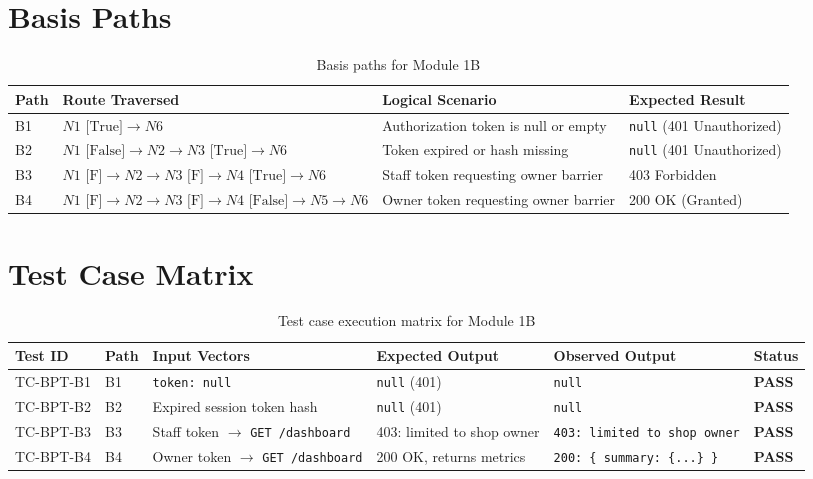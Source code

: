 \documentclass[12pt, a4paper]{report}
\begin{document}
\section{Basis Paths}
\begin{table}[H]
\centering
\footnotesize
\begin{tabularx}{\textwidth}{L{1.2cm} L{5.8cm} L{5.5cm} L{2.8cm}}
\toprule
\textbf{Path} & \textbf{Route Traversed} & \textbf{Logical Scenario} & \textbf{Expected Result} \\
\midrule
B1 & $N1\text{ [True]} \to N6$ & Authorization token is null or empty & \texttt{null} (401 Unauthorized) \\
B2 & $N1\text{ [False]} \to N2 \to N3\text{ [True]} \to N6$ & Token expired or hash missing & \texttt{null} (401 Unauthorized) \\
B3 & $N1\text{ [F]} \to N2 \to N3\text{ [F]} \to N4\text{ [True]} \to N6$ & Staff token requesting owner barrier & 403 Forbidden \\
B4 & $N1\text{ [F]} \to N2 \to N3\text{ [F]} \to N4\text{ [False]} \to N5 \to N6$ & Owner token requesting owner barrier & 200 OK (Granted) \\
\bottomrule
\end{tabularx}
\caption{Basis paths for Module 1B}
\label{tab:paths_1b}
\end{table}

\section{Test Case Matrix}
\begin{table}[H]
\centering
\footnotesize
\begin{tabularx}{\textwidth}{L{2.0cm} C{1.0cm} L{3.8cm} L{3.5cm} L{3.5cm} C{1.2cm}}
\toprule
\textbf{Test ID} & \textbf{Path} & \textbf{Input Vectors} & \textbf{Expected Output} & \textbf{Observed Output} & \textbf{Status} \\
\midrule
TC-BPT-B1 & B1 & \texttt{token: null} & \texttt{null} (401) & \texttt{null} & \textbf{PASS} \\
TC-BPT-B2 & B2 & Expired session token hash & \texttt{null} (401) & \texttt{null} & \textbf{PASS} \\
TC-BPT-B3 & B3 & Staff token $\to$ \texttt{GET /dashboard} & 403: limited to shop owner & \texttt{403: limited to shop owner} & \textbf{PASS} \\
TC-BPT-B4 & B4 & Owner token $\to$ \texttt{GET /dashboard} & 200 OK, returns metrics & \texttt{200: \{ summary: \{...\} \}} & \textbf{PASS} \\
\bottomrule
\end{tabularx}
\caption{Test case execution matrix for Module 1B}
\label{tab:matrix_1b}
\end{table}
\end{document}
